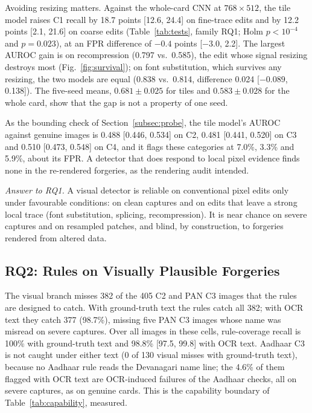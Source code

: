 \documentclass[12pt]{article}
\begin{document}
Avoiding resizing matters. Against the whole-card CNN at
$768{\times}512$, the tile model raises C1 recall by 18.7 points
[12.6, 24.4] on fine-trace edits and by 12.2 points [2.1, 21.6] on
coarse edits (Table~\ref{tab:tests}, family RQ1; Holm $p<10^{-4}$ and
$p=0.023$), at an FPR difference of $-0.4$ points [$-3.0$, 2.2]. The
largest AUROC gain is on recompression (0.797 vs.\ 0.585), the edit
whose signal resizing destroys most (Fig.~\ref{fig:survival}); on font
substitution, which survives any resizing, the two models are equal
(0.838 vs.\ 0.814, difference 0.024 [$-0.089$, 0.138]). The five-seed
means, $0.681\pm0.025$ for tiles and $0.583\pm0.028$ for the whole card,
show that the gap is not a property of one seed.

As the bounding check of Section~\ref{subsec:probe}, the tile model's
AUROC against genuine images is 0.488 [0.446, 0.534] on C2, 0.481
[0.441, 0.520] on C3 and 0.510 [0.473, 0.548] on C4, and it flags these
categories at 7.0\%, 3.3\% and 5.9\%, about its FPR. A detector that does
respond to local pixel evidence finds none in the re-rendered
forgeries, as the rendering audit intended.

\emph{Answer to RQ1.} A visual detector is reliable on conventional
pixel edits only under favourable conditions: on clean captures and on
edits that leave a strong local trace (font substitution, splicing,
recompression). It is near chance on
severe captures and on resampled patches, and blind, by construction,
to forgeries rendered from altered data.

\subsection{RQ2: Rules on Visually Plausible Forgeries}
\label{subsec:res-rq2}

The visual branch misses 382 of the 405 C2 and PAN C3 images that the
rules are designed to catch. With ground-truth text the rules catch all
382; with OCR text they catch 377 (98.7\%), missing five PAN C3 images
whose name was misread on severe captures. Over all images in these
cells, rule-coverage recall is 100\% with ground-truth text and 98.8\%
[97.5, 99.8] with OCR text. Aadhaar C3 is not caught under either text
(0 of 130 visual misses with ground-truth text), because no Aadhaar rule
reads the Devanagari name line; the 4.6\% of them flagged with OCR
text are OCR-induced failures of the Aadhaar checks, all on severe
captures, as on genuine cards. This is the capability boundary of Table~\ref{tab:capability},
measured.
\end{document}
